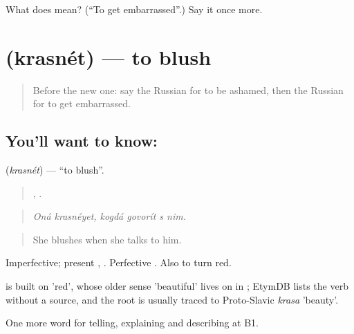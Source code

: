 \begin{tcolorbox}[breakable,colback=teal!4,colframe=teal!35!black,title={Before you move on}]
What does  mean? (\textquotedblleft{}To get embarrassed\textquotedblright{}.) Say it once more.
\end{tcolorbox}
\section[\texorpdfstring{\ru{краснеть} (krasnét)}{краснеть (krasnét)}]{ (krasnét) — to blush}

\label{lesson:RU-C470-krasnet}



\begin{quote}
Before the new one: say the Russian for to be ashamed, then the Russian for to get embarrassed.
\end{quote}

\subsection*{You'll want to know: }
\textbf{} (\emph{krasnét}) — \textquotedblleft{}to blush\textquotedblright{}.

\begin{quote}
 ,    .
\end{quote}

\begin{quote}
\emph{Oná krasnéyet, kogdá govorít s nim.}
\end{quote}

\begin{quote}
She blushes when she talks to him.
\end{quote}

Imperfective; present , . Perfective . Also to turn red.

\begin{cousinweb}
\emph{} is built on \emph{} 'red', whose older sense 'beautiful' lives on in \emph{}; EtymDB lists the verb without a source, and the root is usually traced to Proto-Slavic \emph{krasa} 'beauty'.
\end{cousinweb}

\begin{grammarlens}[title={What you've built}]
One more word for telling, explaining and describing at B1.
\end{grammarlens}


